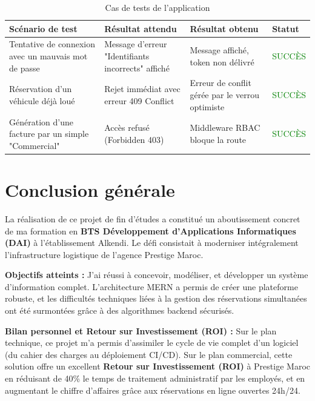 \documentclass[12pt, a4paper]{report}
\begin{document}
\begin{table}[H]
    \centering
    \renewcommand{\arraystretch}{1.5}
    \begin{tabular}{|p{4cm}|p{4cm}|p{4cm}|p{2cm}|}
        \hline
        \cellcolor{gray!20}\textbf{Scénario de test} & \cellcolor{gray!20}\textbf{Résultat attendu} & \cellcolor{gray!20}\textbf{Résultat obtenu} & \cellcolor{gray!20}\textbf{Statut} \\
        \hline
        Tentative de connexion avec un mauvais mot de passe & Message d'erreur "Identifiants incorrects" affiché & Message affiché, token non délivré & \textcolor{green}{SUCCÈS} \\
        \hline
        Réservation d'un véhicule déjà loué & Rejet immédiat avec erreur 409 Conflict & Erreur de conflit gérée par le verrou optimiste & \textcolor{green}{SUCCÈS} \\
        \hline
        Génération d'une facture par un simple "Commercial" & Accès refusé (Forbidden 403) & Middleware RBAC bloque la route & \textcolor{green}{SUCCÈS} \\
        \hline
    \end{tabular}
    \caption{Cas de tests de l'application}
\end{table}

\chapter*{Conclusion générale}

La réalisation de ce projet de fin d'études a constitué un aboutissement concret de ma formation en \textbf{BTS Développement d'Applications Informatiques (DAI)} à l'établissement Alkendi. Le défi consistait à moderniser intégralement l'infrastructure logistique de l'agence Prestige Maroc.

\textbf{Objectifs atteints :} 
J'ai réussi à concevoir, modéliser, et développer un système d'information complet. L'architecture MERN a permis de créer une plateforme robuste, et les difficultés techniques liées à la gestion des réservations simultanées ont été surmontées grâce à des algorithmes backend sécurisés. 

\textbf{Bilan personnel et Retour sur Investissement (ROI) :} 
Sur le plan technique, ce projet m'a permis d'assimiler le cycle de vie complet d'un logiciel (du cahier des charges au déploiement CI/CD). Sur le plan commercial, cette solution offre un excellent \textbf{Retour sur Investissement (ROI)} à Prestige Maroc en réduisant de 40\% le temps de traitement administratif par les employés, et en augmentant le chiffre d'affaires grâce aux réservations en ligne ouvertes 24h/24.
\end{document}
